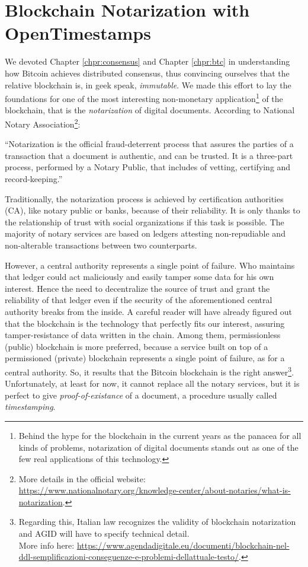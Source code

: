 \chapter{Blockchain Notarization with OpenTimestamps}
\label{chpr:notarization}

We devoted Chapter \ref{chpr:consensus} and Chapter \ref{chpr:btc} in understanding how Bitcoin achieves distributed consensus, thus convincing ourselves that the relative blockchain is, in geek speak, \textit{immutable}. We made this effort to lay the foundations for one of the most interesting non-monetary application\footnote{Behind the hype for the blockchain in the current years as the panacea for all kinds of problems, notarization of digital documents stands out as one of the few real applications of this technology.} of the blockchain, that is the \textit{notarization} of digital documents. According to National Notary Association\footnote{More details in the official website: \url{https://www.nationalnotary.org/knowledge-center/about-notaries/what-is-notarization}.}:

\bigskip
\noindent
\enquote{Notarization is the official fraud-deterrent process that assures the parties of a transaction that a document is authentic, and can be trusted. It is a three-part process, performed by a Notary Public, that includes of vetting, certifying and record-keeping.}

\bigskip
\noindent
Traditionally, the notarization process is achieved by certification authorities (CA), like notary public or banks, because of their reliability. It is only thanks to the relationship of trust with social organizations if this task is possible. The majority of notary services are based on ledgers attesting non-repudiable and non-alterable transactions between two counterparts.

\bigskip
\noindent
However, a central authority represents a single point of failure. Who maintains that ledger could act maliciously and easily tamper some data for his own interest. Hence the need to decentralize the source of trust and grant the reliability of that ledger even if the security of the aforementioned central authority breaks from the inside. A careful reader will have already figured out that the blockchain is the technology that perfectly fits our interest, assuring tamper-resistance of data written in the chain. Among them, permissionless (public) blockchain is more preferred, because a service built on top of a permissioned (private) blockchain represents a single point of failure, as for a central authority. So, it results that the Bitcoin blockchain is the right answer\footnote{Regarding this, Italian law recognizes the validity of blockchain notarization and AGID will have to specify technical detail. \\ More info here: \url{https://www.agendadigitale.eu/documenti/blockchain-nel-ddl-semplificazioni-conseguenze-e-problemi-dellattuale-testo/}.}. Unfortunately, at least for now, it cannot replace all the notary services, but it is perfect to give \textit{proof-of-existance} of a document, a procedure usually called \textit{timestamping}.

